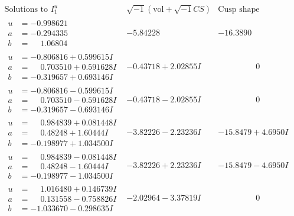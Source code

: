 \documentclass[1p]{elsarticle_modified}
\theoremstyle{definition}
\newcommand{\I}{\sqrt{-1}}
\begin{document}
$$\begin{array}{c|c|c}  
\text{Solutions to }I^u_{1}& \I (\text{vol} + \sqrt{-1}CS) & \text{Cusp shape}\\
 \hline 
\begin{aligned}
u &= -0.998621\phantom{ +0.000000I} \\
a &= -0.294335\phantom{ +0.000000I} \\
b &= \phantom{-}1.06804\phantom{ +0.000000I}\end{aligned}
 & -5.84228\phantom{ +0.000000I} & -16.3890\phantom{ +0.000000I} \\ \hline\begin{aligned}
u &= -0.806816 + 0.599615 I \\
a &= \phantom{-}0.703510 + 0.591628 I \\
b &= -0.319657 + 0.693146 I\end{aligned}
 & -0.43718 + 2.02855 I & \phantom{-0.000000 } 0 \\ \hline\begin{aligned}
u &= -0.806816 - 0.599615 I \\
a &= \phantom{-}0.703510 - 0.591628 I \\
b &= -0.319657 - 0.693146 I\end{aligned}
 & -0.43718 - 2.02855 I & \phantom{-0.000000 } 0 \\ \hline\begin{aligned}
u &= \phantom{-}0.984839 + 0.081448 I \\
a &= \phantom{-}0.48248 + 1.60444 I \\
b &= -0.198977 + 1.034500 I\end{aligned}
 & -3.82226 - 2.23236 I & -15.8479 + 4.6950 I \\ \hline\begin{aligned}
u &= \phantom{-}0.984839 - 0.081448 I \\
a &= \phantom{-}0.48248 - 1.60444 I \\
b &= -0.198977 - 1.034500 I\end{aligned}
 & -3.82226 + 2.23236 I & -15.8479 - 4.6950 I \\ \hline\begin{aligned}
u &= \phantom{-}1.016480 + 0.146739 I \\
a &= \phantom{-}0.131558 - 0.758826 I \\
b &= -1.033670 - 0.298635 I\end{aligned}
 & -2.02964 - 3.37819 I & \phantom{-0.000000 } 0 \\ \hline\begin{aligned}

\end{aligned}
\end{array}$$
\end{document}
